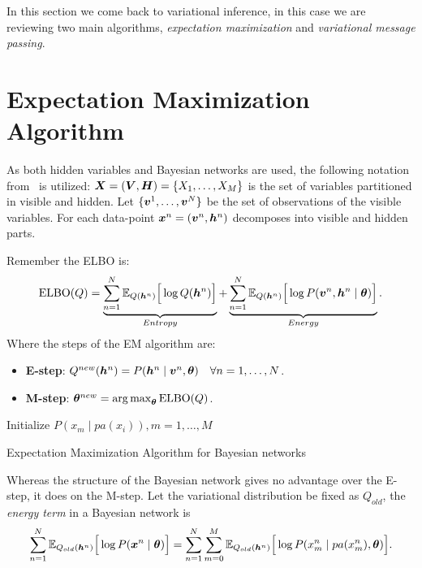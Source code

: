 
In this section we come back to variational inference, in this case we are  reviewing two main algorithms, \emph{expectation maximization} and \emph{variational message passing}.


\section{Expectation Maximization Algorithm}

As both hidden variables and Bayesian networks are used, the following notation from~\cite{barber} is utilized: \(\bm{X} = (\bm{V}, \bm{H}) = \{X_{1}, \dots , X_{M}\}\) is the set of variables partitioned in visible and hidden. Let \(\{\bm{v}^{1}, \dots, \bm{v}^{N}\}\) be the set of observations of the visible variables. For each data-point \(\bm{x}^{n} = (\bm{v}^{n}, \bm{h}^{n})\) decomposes into visible and hidden parts.

Remember the ELBO is:
\[
  \text{ELBO}(Q) = \underbrace{\sum_{n=1}^{N}\mathbb{E}_{Q(\bm{h}^{n})}\Big[\log{Q(\bm{h}^{n})}\Big]}_{Entropy} + \underbrace{\sum_{n=1}^{N}\mathbb{E}_{Q(\bm{h}^{n})}\Big[\log{P(\bm{v}^{n}, \bm{h}^{n} \mid \bm{\theta})}\Big]}_{Energy}.
\]
Where the steps of the EM algorithm are:
\begin{itemize}
  \item \textbf{E-step}:  \(Q^{new}(\bm{h}^{n}) = P(\bm{h}^{n} \mid \bm{v}^{n} , \bm{\theta}) \quad \forall n=1,\dots,N\).
  \item \textbf{M-step}: \(\bm{\theta}^{new} = \operatorname*{arg\,max}_{\bm{\theta}} \text{ELBO}(Q)\).
\end{itemize}

\begin{algorithm}[ht]
  \SetAlgoLined{}
  Initialize \( P(x_{m}\mid pa(x_{i})), m=1,\dots,M \)\;
  \;
  \caption{Expectation Maximization Algorithm for Bayesian networks}\label{alg:em_bn}
\end{algorithm}


Whereas the structure of the Bayesian network gives no advantage over the E-step, it does on the M-step. Let the variational distribution be fixed as \(Q_{old}\), the \emph{energy term} in a Bayesian network is
\[
  \sum_{n=1}^{N} \mathbb{E}_{Q_{old}(\bm{h}^{n})}\Big[ \log{P(\bm{x}^{n} \mid \bm{\theta})} \Big] = \sum_{n = 1}^{N}\sum_{m = 0}^{M} \mathbb{E}_{Q_{old}(\bm{h}^{n})}\Big[\log{P( x_{m}^{n} \mid pa(x_{m}^{n}), \bm{\theta})}\Big].
\]

